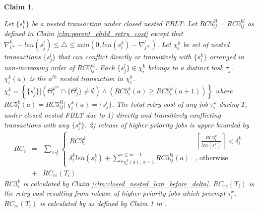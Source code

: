 \documentclass[10pt, conference, compsocconf]{IEEEtran}
\newtheorem{clm}{Claim}
\begin{document}
\begin{clm}\label{clm:closed_nested_fblt_final}

Let $\{s_{i}^{k}\}$ be a nested transaction under closed nested FBLT.
Let $RC5_{ij}^{kl}=RC0_{ij}^{kl}$ as defined in Claim \ref{clm:parent_child_retry_cost}
except that $\nabla_{i*}^{k}-len\left(s_{j}^{l}\right)\le\triangle\le min\left(0,len\left(s_{i}^{k}\right)-\nabla_{j*}^{l}\right)$.
Let $\chi_{i}^{k}$ be set of nested transactions $\{s_{j}^{l}\}$
that can conflict directly or transitively with $\{s_{i}^{k}\}$ arranged
in non-increasing order of $RC0_{ij}^{kl}$. Each $\{s_{j}^{l}\}\in\chi_{i}^{k}$
belongs to a distinct task $\tau_{j}$. $\chi_{i}^{k}(a)$ is the
$a^{th}$ nested transaction in $\chi_{i}^{k}$. $\chi_{i}^{k}=\left\{ \{s_{j}^{l}\}|\left(\Theta_{i}^{k^{ex}}\cap\{\Theta_{j}^{l}\}\neq\emptyset\right)\wedge\left(RC5_{i}^{k}(a)\ge RC5_{i}^{k}(a+1)\right)\right\} $
where $RC5_{i}^{k}(a)=RC5_{ij}^{kl}|\,\chi_{i}^{k}(a)=\{s_{j}^{l}\}$.
The total retry cost of any job $\tau_{i}^{x}$ during $T_{i}$ under
closed nested FBLT due to 1) directly and transitively conflicting
transactions with any $\{s_{i}^{k}\}$. 2) release of higher priority
jobs is upper bounded by 
\begin{eqnarray}
RC_{i} & = & \sum_{\forall s_{i}^{k}}\begin{cases}
RC3_{i}^{k} & \,\left\lceil \frac{RC3_{i}^{k}}{len\left(s_{i}^{k}\right)}\right\rceil <\delta_{i}^{k}\\
\delta_{i}^{k}len\left(s_{i}^{k}\right)+\sum_{\forall\chi_{i}^{k}(a),\, a=1}^{a\le m-1}RC5_{ij}^{kl}(a) & \mbox{, otherwise}
\end{cases}\nonumber \\
 & + & RC_{re}(T_{i})\label{eq:closed_nested_fblt_after_delta}
\end{eqnarray}
$RC3_{i}^{k}$ is calculated by Claim \ref{clm:closed_nested_lcm_before_delta}.
$RC_{re}(T_{i})$ is the retry cost resulting from release of higher
priority jobs which preempt $\tau_{i}^{x}$. $RC_{re}(T_{i})$ is
calculated by as defined by Claim 1 in \cite{fblt}.

\end{clm}
\end{document}

